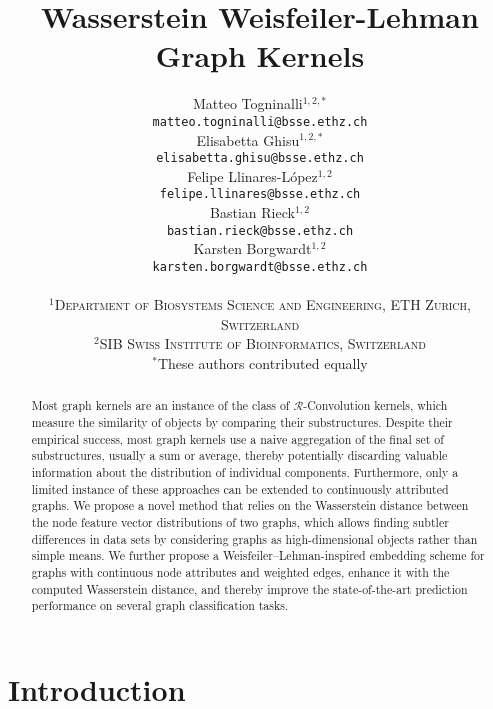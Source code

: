 \documentclass{article}
\title{Wasserstein Weisfeiler-Lehman Graph Kernels}
\author{Matteo Togninalli$^{1, 2, *}$ \\
  \small\texttt{matteo.togninalli@bsse.ethz.ch} \\
  \And
  Elisabetta Ghisu$^{1, 2, *}$ \\
  \small\texttt{elisabetta.ghisu@bsse.ethz.ch} \\
  \And
  Felipe Llinares-L\'{o}pez$^{1, 2}$ \\
  \small\texttt{felipe.llinares@bsse.ethz.ch} \\
  \And
  Bastian Rieck$^{1, 2}$\\
  \small\texttt{bastian.rieck@bsse.ethz.ch} \\
  \And
  Karsten Borgwardt$^{1, 2}$ \\
  \small\texttt{karsten.borgwardt@bsse.ethz.ch} \\\\
  \small\textsc{$^{1}$Department of Biosystems Science and Engineering, ETH Zurich, Switzerland}\\
    \small\textsc{$^{2}$SIB Swiss Institute of Bioinformatics, Switzerland}\\
    \small{$^{*}$These authors contributed equally}\\
}
\begin{document}
\maketitle




\begin{abstract}
Most graph kernels are an instance of the class of \mbox{$\mathcal{R}$-Convolution} kernels, which measure the similarity of objects by comparing their substructures.
Despite their empirical success, most graph kernels use a naive aggregation of the final set of substructures, usually a sum or average, thereby potentially discarding valuable information about the distribution of individual components. Furthermore, only a limited instance of these approaches can be extended to continuously attributed graphs. 
We propose a novel method that relies on the Wasserstein distance between the node feature vector distributions of two graphs, which allows finding subtler differences in data sets by considering graphs as high-dimensional objects  rather than simple means.
We further propose a Weisfeiler--Lehman-inspired embedding scheme for graphs with continuous node attributes and weighted edges, enhance it with the computed Wasserstein distance, and thereby improve the state-of-the-art prediction performance on several graph classification tasks.
\end{abstract}

\section{Introduction}
\label{introduction}
\end{document}

